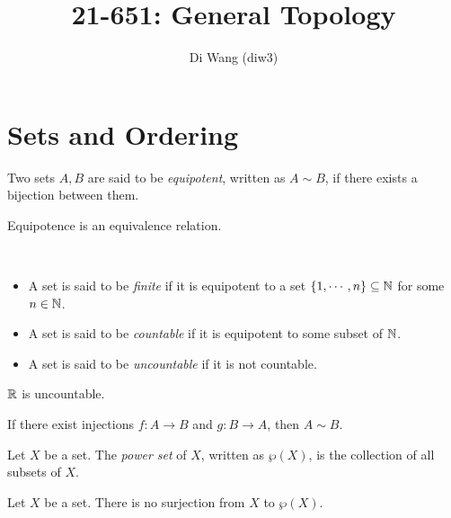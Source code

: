 \documentclass{techreport}
\begin{document}
\title{21-651: General Topology}
\author[Di Wang]{Di Wang (diw3)}
\maketitle

\section{Sets and Ordering}

\begin{definition}\label{De:Equipotent}
	Two sets $A,B$ are said to be \emph{equipotent}, written as $A \sim B$, if there exists a bijection between them.
\end{definition}

\begin{remark}\label{Rem:EquipotenceIsEquivalence}
	Equipotence is an equivalence relation.
\end{remark}

\begin{definition}\label{De:Countability}\
	\begin{itemize}
		\item A set is said to be \emph{finite} if it is equipotent to a set $\{1,\cdots,n\} \subseteq \mathbb{N}$ for some $n \in \mathbb{N}$.
		\item A set is said to be \emph{countable} if it is equipotent to some subset of $\mathbb{N}$.
		\item A set is said to be \emph{uncountable} if it is not countable.
	\end{itemize}
\end{definition}

\begin{remark}\label{Rem:RIsUncountable}
	$\mathbb{R}$ is uncountable.
\end{remark}

\begin{theorem}\label{The:CantorBernsteinSchroder}
	If there exist injections $f:A \to B$ and $g : B \to A$, then $A \sim B$.
\end{theorem}

\begin{definition}\label{De:PowerSet}
	Let $X$ be a set.
	The \emph{power set} of $X$, written as $\wp(X)$, is the collection of all subsets of $X$.
\end{definition}

\begin{lemma}[Cantor]\label{Lem:CantorPowerSet}
	Let $X$ be a set. There is no surjection from $X$ to $\wp(X)$.
\end{lemma}
\end{document}
